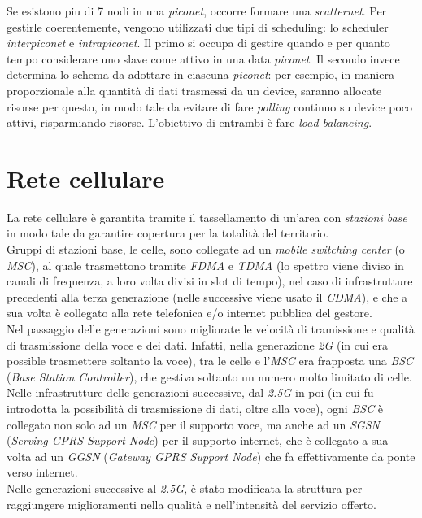 Se esistono piu di 7 nodi in una \textit{piconet}, occorre formare una \textit{scatternet}. Per gestirle coerentemente, vengono utilizzati due tipi di scheduling: lo scheduler \textit{interpiconet} e \textit{intrapiconet}. Il primo si occupa di gestire quando e per quanto tempo considerare uno slave come attivo in una data \textit{piconet}. Il secondo invece determina lo schema da adottare in ciascuna \textit{piconet}: per esempio, in maniera proporzionale alla quantità di dati trasmessi da un device, saranno allocate risorse per questo, in modo tale da evitare di fare \textit{polling} continuo su device poco attivi, risparmiando risorse. L'obiettivo di entrambi è fare \textit{load balancing}.

\section{Rete cellulare}
La rete cellulare è garantita tramite il tassellamento di un'area con \textit{stazioni base} in modo tale da garantire copertura per la totalità del territorio. \\ Gruppi di stazioni base, le celle, sono collegate ad un \textit{mobile switching center} (o \textit{MSC}), al quale trasmettono tramite \textit{FDMA} e \textit{TDMA} (lo spettro viene diviso in canali di frequenza, a loro volta divisi in slot di tempo), nel caso di infrastrutture precedenti alla terza generazione (nelle successive viene usato il \textit{CDMA}), e che a sua volta è collegato alla rete telefonica e/o internet pubblica del gestore. \\
Nel passaggio delle generazioni sono migliorate le velocità di tramissione e qualità di trasmissione della voce e dei dati. Infatti, nella generazione \textit{2G} (in cui era possible trasmettere soltanto la voce), tra le celle e l'\textit{MSC} era frapposta una \textit{BSC} (\textit{Base Station Controller}), che gestiva soltanto un numero molto limitato di celle. \\
Nelle infrastrutture delle generazioni successive, dal \textit{2.5G} in poi (in cui fu introdotta la possibilità di trasmissione di dati, oltre alla voce), ogni \textit{BSC} è collegato non solo ad un \textit{MSC} per il supporto voce, ma anche ad un \textit{SGSN} (\textit{Serving GPRS Support Node}) per il supporto internet, che è collegato a sua volta ad un \textit{GGSN} (\textit{Gateway GPRS Support Node}) che fa effettivamente da ponte verso internet. \\
Nelle generazioni successive al \textit{2.5G}, è stato modificata la struttura per raggiungere miglioramenti nella qualità e nell'intensità del servizio offerto. \\ \\

